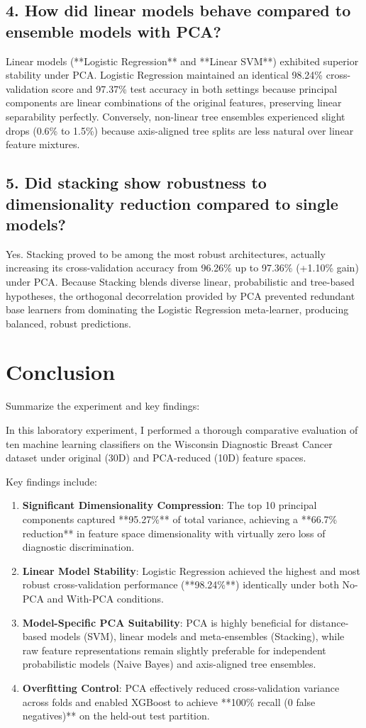 \documentclass[12pt,a4paper]{article}
\begin{document}
\subsection*{4. How did linear models behave compared to ensemble models with PCA?}
Linear models (**Logistic Regression** and **Linear SVM**) exhibited superior stability under PCA. Logistic Regression maintained an identical 98.24\% cross-validation score and 97.37\% test accuracy in both settings because principal components are linear combinations of the original features, preserving linear separability perfectly. Conversely, non-linear tree ensembles experienced slight drops (0.6\% to 1.5\%) because axis-aligned tree splits are less natural over linear feature mixtures.

\subsection*{5. Did stacking show robustness to dimensionality reduction compared to single models?}
Yes. Stacking proved to be among the most robust architectures, actually increasing its cross-validation accuracy from 96.26\% up to 97.36\% (+1.10\% gain) under PCA. Because Stacking blends diverse linear, probabilistic and tree-based hypotheses, the orthogonal decorrelation provided by PCA prevented redundant base learners from dominating the Logistic Regression meta-learner, producing balanced, robust predictions.

\section{Conclusion}
Summarize the experiment and key findings:

In this laboratory experiment, I performed a thorough comparative evaluation of ten machine learning classifiers on the Wisconsin Diagnostic Breast Cancer dataset under original (30D) and PCA-reduced (10D) feature spaces.

Key findings include:
\begin{enumerate}
\item \textbf{Significant Dimensionality Compression}: The top 10 principal components captured **95.27\%** of total variance, achieving a **66.7\% reduction** in feature space dimensionality with virtually zero loss of diagnostic discrimination.
\item \textbf{Linear Model Stability}: Logistic Regression achieved the highest and most robust cross-validation performance (**98.24\%**) identically under both No-PCA and With-PCA conditions.
\item \textbf{Model-Specific PCA Suitability}: PCA is highly beneficial for distance-based models (SVM), linear models and meta-ensembles (Stacking), while raw feature representations remain slightly preferable for independent probabilistic models (Naive Bayes) and axis-aligned tree ensembles.
\item \textbf{Overfitting Control}: PCA effectively reduced cross-validation variance across folds and enabled XGBoost to achieve **100\% recall (0 false negatives)** on the held-out test partition.
\end{enumerate}
\end{document}
